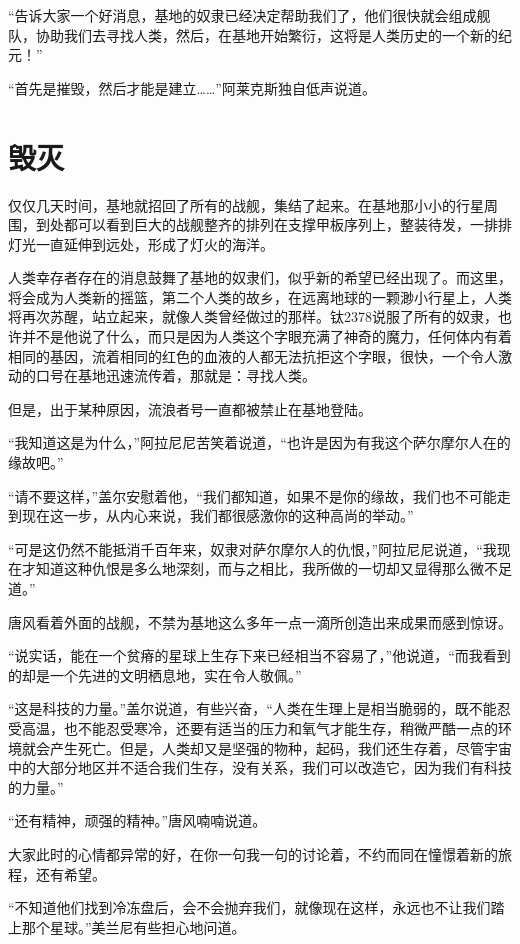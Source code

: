 “告诉大家一个好消息，基地的奴隶已经决定帮助我们了，他们很快就会组成舰队，协助我们去寻找人类，然后，在基地开始繁衍，这将是人类历史的一个新的纪元！” 

“首先是摧毁，然后才能是建立……”阿莱克斯独自低声说道。 

\chapter{毁灭}

仅仅几天时间，基地就招回了所有的战舰，集结了起来。在基地那小小的行星周围，到处都可以看到巨大的战舰整齐的排列在支撑甲板序列上，整装待发，一排排灯光一直延伸到远处，形成了灯火的海洋。 

人类幸存者存在的消息鼓舞了基地的奴隶们，似乎新的希望已经出现了。而这里，将会成为人类新的摇篮，第二个人类的故乡，在远离地球的一颗渺小行星上，人类将再次苏醒，站立起来，就像人类曾经做过的那样。钛2378说服了所有的奴隶，也许并不是他说了什么，而只是因为人类这个字眼充满了神奇的魔力，任何体内有着相同的基因，流着相同的红色的血液的人都无法抗拒这个字眼，很快，一个令人激动的口号在基地迅速流传着，那就是：寻找人类。 

但是，出于某种原因，流浪者号一直都被禁止在基地登陆。 

“我知道这是为什么，”阿拉尼尼苦笑着说道，“也许是因为有我这个萨尔摩尔人在的缘故吧。” 

“请不要这样，”盖尔安慰着他，“我们都知道，如果不是你的缘故，我们也不可能走到现在这一步，从内心来说，我们都很感激你的这种高尚的举动。” 

“可是这仍然不能抵消千百年来，奴隶对萨尔摩尔人的仇恨，”阿拉尼尼说道，“我现在才知道这种仇恨是多么地深刻，而与之相比，我所做的一切却又显得那么微不足道。” 

唐风看着外面的战舰，不禁为基地这么多年一点一滴所创造出来成果而感到惊讶。 

“说实话，能在一个贫瘠的星球上生存下来已经相当不容易了，”他说道，“而我看到的却是一个先进的文明栖息地，实在令人敬佩。” 

“这是科技的力量。”盖尔说道，有些兴奋，“人类在生理上是相当脆弱的，既不能忍受高温，也不能忍受寒冷，还要有适当的压力和氧气才能生存，稍微严酷一点的环境就会产生死亡。但是，人类却又是坚强的物种，起码，我们还生存着，尽管宇宙中的大部分地区并不适合我们生存，没有关系，我们可以改造它，因为我们有科技的力量。” 

“还有精神，顽强的精神。”唐风喃喃说道。 

大家此时的心情都异常的好，在你一句我一句的讨论着，不约而同在憧憬着新的旅程，还有希望。 

“不知道他们找到冷冻盘后，会不会抛弃我们，就像现在这样，永远也不让我们踏上那个星球。”美兰尼有些担心地问道。 

